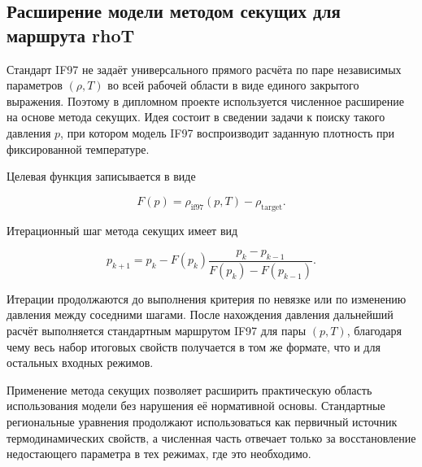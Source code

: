 \subsection{Расширение модели методом секущих для маршрута rhoT}

Стандарт IF97 не задаёт универсального прямого расчёта по паре
независимых параметров $(\rho, T)$ во всей рабочей области в виде единого
закрытого выражения.
Поэтому в дипломном проекте используется численное расширение на основе метода
секущих.
Идея состоит в сведении задачи к поиску такого давления $p$, при котором
модель IF97 воспроизводит заданную плотность при фиксированной температуре.

Целевая функция записывается в виде

\begin{equation}
F(p) = \rho_{\mathrm{if97}}(p, T) - \rho_{\mathrm{target}}.
\end{equation}

Итерационный шаг метода секущих имеет вид

\begin{equation}
p_{k+1} =
p_{k} - F(p_{k}) \frac{p_{k} - p_{k-1}}{F(p_{k}) - F(p_{k-1})}.
\end{equation}

Итерации продолжаются до выполнения критерия по невязке или по изменению
давления между соседними шагами.
После нахождения давления дальнейший расчёт выполняется стандартным маршрутом
IF97 для пары $(p, T)$, благодаря чему весь набор итоговых свойств получается в
том же формате, что и для остальных входных режимов.

Применение метода секущих позволяет расширить практическую область использования
модели без нарушения её нормативной основы.
Стандартные региональные уравнения продолжают использоваться как первичный
источник термодинамических свойств, а численная часть отвечает только за
восстановление недостающего параметра в тех режимах, где это необходимо.
